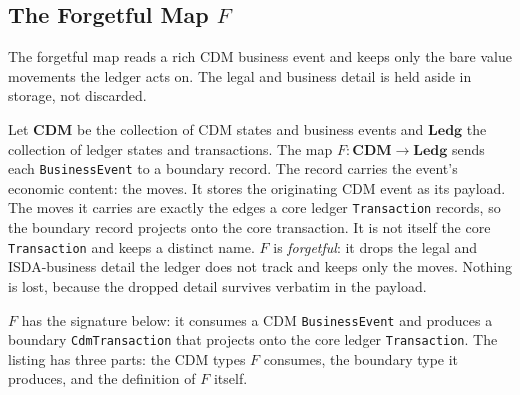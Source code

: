 \subsection{The Forgetful Map \texorpdfstring{$F$}{F}}

The forgetful map reads a rich CDM business event and keeps only the bare value movements the ledger acts on. The legal and business detail is held aside in storage, not discarded.

Let $\mathbf{CDM}$ be the collection of CDM states and business events and $\mathbf{Ledg}$ the collection of ledger states and transactions. The map $F : \mathbf{CDM} \to \mathbf{Ledg}$ sends each \texttt{BusinessEvent} to a boundary record. The record carries the event's economic content: the moves. It stores the originating CDM event as its payload. The moves it carries are exactly the edges a core ledger \texttt{Transaction} records, so the boundary record projects onto the core transaction. It is not itself the core \texttt{Transaction} and keeps a distinct name. $F$ is \textit{forgetful}: it drops the legal and ISDA-business detail the ledger does not track and keeps only the moves. Nothing is lost, because the dropped detail survives verbatim in the payload.

\medskip
$F$ has the signature below: it consumes a CDM \texttt{BusinessEvent} and produces a boundary \texttt{CdmTransaction} that projects onto the core ledger \texttt{Transaction}. The listing has three parts: the CDM types $F$ consumes, the boundary type it produces, and the definition of $F$ itself.

